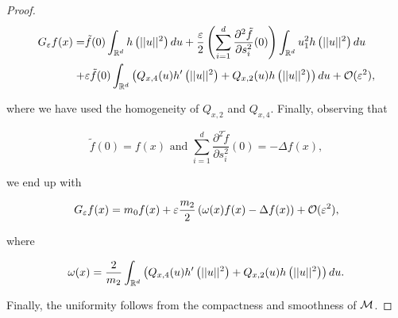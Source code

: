 \begin{proof}
\begin{equation*}\begin{aligned}
G_\varepsilon f(x)=&\tilde{f}(0)\int_{\mathbb{R}^d}h\left(||u||^2 \right)du + \frac{\varepsilon}{2}\left(\sum\limits_{i=1}^d \frac{\partial^2 \tilde{f}}{\partial s_i^2}(0) \right)\int_{\mathbb{R}^d}u_1^2 h\left(||u||^2\right)du \\
+&\varepsilon\tilde{f}(0)\int_{\mathbb{R}^d}\left(Q_{x,4}(u)h'\left(||u||^2\right) + Q_{x,2}(u)h\left(||u||^2\right)\right)du + \mathcal{O}(\varepsilon^2),
\end{aligned}\end{equation*}

where we have used the homogeneity of $Q_{x,2}$ and $Q_{x,4}$. Finally, observing that

\begin{equation*}
\tilde{f}(0) = f(x) \text{ and } \sum_{i=1}^d \frac{\partial^2 \tilde{f}}{\partial s_i^2}(0) = -\Delta f(x),
\end{equation*}

we end up with

\begin{equation*}
G_\varepsilon f(x)=m_0 f(x)+\varepsilon\frac{m_2}{2}\left(\omega(x)f(x)-\Delta f(x) \right)+\mathcal{O}(\varepsilon^2),
\end{equation*}

where

\begin{equation*}
\omega(x)=\frac{2}{m_2}\int_{\mathbb{R}^d}\left(Q_{x,4}(u)h'\left(||u||^2 \right) + Q_{x,2}(u)h\left(||u||^2 \right) \right)du.
\end{equation*}

Finally, the uniformity follows from the compactness and smoothness of $\mathcal{M}$.
\end{proof}



























